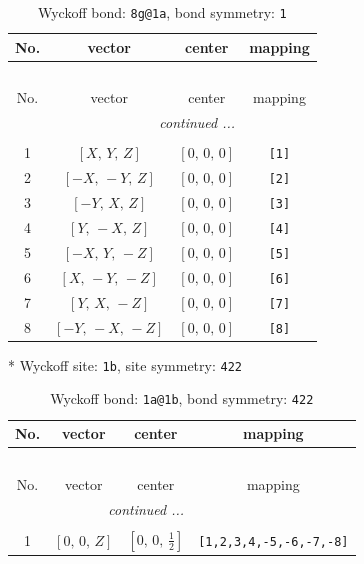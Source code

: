 \documentclass[fleqn,8pt]{jsarticle}
\begin{document}
\renewcommand{\arraystretch}{1.2}
\begin{longtable}{cccc}
\caption{Wyckoff bond: {\tt 8g@1a}, bond symmetry: {\tt 1}}
 \\
 \hline \hline
No. & vector & center & mapping \\ \hline \endfirsthead

\multicolumn{3}{l}{\tablename\ \thetable{}} \\
 \hline \hline
No. & vector & center & mapping \\ \hline \endhead

 \hline \hline
\multicolumn{3}{r}{\footnotesize\it continued ...} \\ \endfoot

 \hline \hline
\multicolumn{3}{r}{} \\ \endlastfoot

1 & $\left[ X,\, Y,\, Z \right]$ & $\left[ 0,\, 0,\, 0 \right]$ & {\tt [1]} \\ \hline
2 & $\left[ - X,\, - Y,\, Z \right]$ & $\left[ 0,\, 0,\, 0 \right]$ & {\tt [2]} \\ \hline
3 & $\left[ - Y,\, X,\, Z \right]$ & $\left[ 0,\, 0,\, 0 \right]$ & {\tt [3]} \\ \hline
4 & $\left[ Y,\, - X,\, Z \right]$ & $\left[ 0,\, 0,\, 0 \right]$ & {\tt [4]} \\ \hline
5 & $\left[ - X,\, Y,\, - Z \right]$ & $\left[ 0,\, 0,\, 0 \right]$ & {\tt [5]} \\ \hline
6 & $\left[ X,\, - Y,\, - Z \right]$ & $\left[ 0,\, 0,\, 0 \right]$ & {\tt [6]} \\ \hline
7 & $\left[ Y,\, X,\, - Z \right]$ & $\left[ 0,\, 0,\, 0 \right]$ & {\tt [7]} \\ \hline
8 & $\left[ - Y,\, - X,\, - Z \right]$ & $\left[ 0,\, 0,\, 0 \right]$ & {\tt [8]} \\
\end{longtable}
* Wyckoff site: {\tt 1b}, site symmetry: {\tt 422}
\renewcommand{\arraystretch}{1.2}
\begin{longtable}{cccc}
\caption{Wyckoff bond: {\tt 1a@1b}, bond symmetry: {\tt 422}}
 \\
 \hline \hline
No. & vector & center & mapping \\ \hline \endfirsthead

\multicolumn{3}{l}{\tablename\ \thetable{}} \\
 \hline \hline
No. & vector & center & mapping \\ \hline \endhead

 \hline \hline
\multicolumn{3}{r}{\footnotesize\it continued ...} \\ \endfoot

 \hline \hline
\multicolumn{3}{r}{} \\ \endlastfoot

1 & $\left[ 0,\, 0,\, Z \right]$ & $\left[ 0,\, 0,\, \frac{1}{2} \right]$ & {\tt [1,2,3,4,-5,-6,-7,-8]} \\
\end{longtable}
\end{document}
